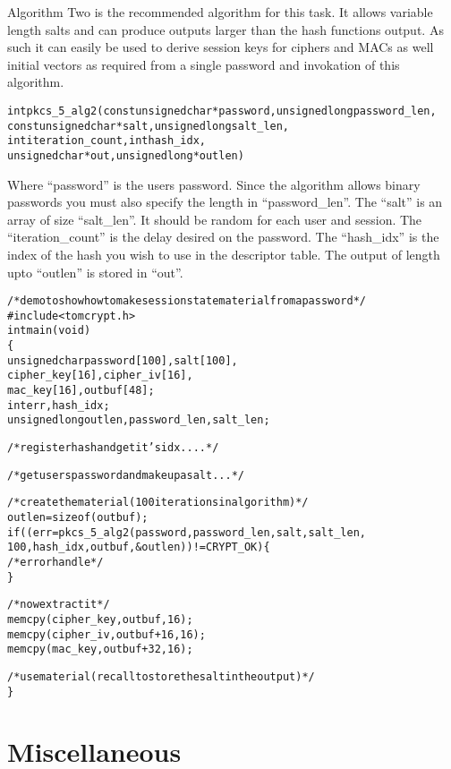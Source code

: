 \documentclass[a4paper]{book}
\begin{document}
Algorithm Two is the recommended algorithm for this task.  It allows variable length salts and can produce outputs larger than the 
hash functions output.  As such it can easily be used to derive session keys for ciphers and MACs as well initial vectors as required
from a single password and invokation of this algorithm.

\begin{alltt}
int pkcs_5_alg2(const unsigned char *password, unsigned long password_len, 
                const unsigned char *salt,     unsigned long salt_len,
                int iteration_count,           int hash_idx,
                unsigned char *out,            unsigned long *outlen)
\end{alltt}
Where ``password'' is the users password.  Since the algorithm allows binary passwords you must also specify the length in ``password\_len''.  
The ``salt'' is an array of size ``salt\_len''.  It should be random for each user and session.  The ``iteration\_count'' is the delay desired
on the password.  The ``hash\_idx'' is the index of the hash you wish to use in the descriptor table.   The output of length upto 
``outlen'' is stored in ``out''.

\begin{alltt}
/* demo to show how to make session state material from a password */
#include <tomcrypt.h>
int main(void)
\{
    unsigned char password[100], salt[100],
                  cipher_key[16], cipher_iv[16],
                  mac_key[16], outbuf[48];
    int           err, hash_idx;
    unsigned long outlen, password_len, salt_len;

    /* register hash and get it's idx .... */

    /* get users password and make up a salt ... */

    /* create the material (100 iterations in algorithm) */
    outlen = sizeof(outbuf);
    if ((err = pkcs_5_alg2(password, password_len, salt, salt_len, 
                           100, hash_idx, outbuf, &outlen)) != CRYPT_OK) \{
       /* error handle */
    \}

    /* now extract it */
    memcpy(cipher_key, outbuf, 16);
    memcpy(cipher_iv,  outbuf+16, 16);
    memcpy(mac_key,    outbuf+32, 16);

    /* use material (recall to store the salt in the output) */
\}
\end{alltt}

\chapter{Miscellaneous}
\end{document}
